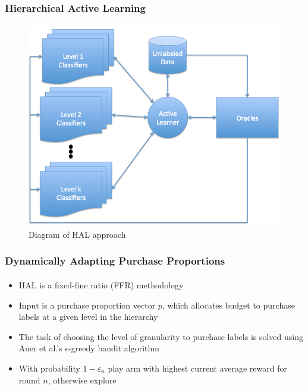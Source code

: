 \documentclass{beamer}
\begin{document}
\begin{frame}
    \frametitle{Hierarchical Active Learning}
    \framesubtitle{}
    \begin{figure}[!htb]
        \centering
        \includegraphics[width=0.65\columnwidth]{fig/AL2}
        \caption{Diagram of HAL approach}
        \label{fig:HALapproach}
    \end{figure}
\end{frame}
\begin{frame}
    \frametitle{Dynamically Adapting Purchase Proportions}
    \framesubtitle{}
    \begin{itemize}
      \item HAL is a fixed-fine ratio (FFR) methodology
      \item Input is a purchase proportion
vector $p$, which allocates budget to purchase labels at a given level in the hierarchy %
      \item The task of choosing the
level of granularity to purchase labels is solved using Auer et al.'s $\epsilon$-greedy bandit algorithm %
\item With probability $1-\varepsilon_n$ play arm with highest current average reward for round $n$, otherwise explore
    \end{itemize}


\end{frame}
\end{document}
